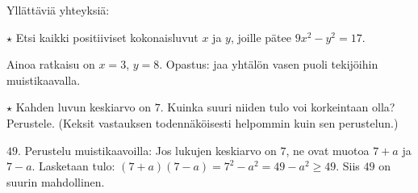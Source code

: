 \begin{tehtavasivu}
\begin{tehtava} 
	Yllättäviä yhteyksiä:

    \begin{vastaus}
    \end{vastaus}
\end{tehtava}

\begin{tehtava}
    $\star$ Etsi kaikki positiiviset kokonaisluvut $x$ ja $y$, joille pätee $9x^2-y^2=17$.
    \begin{vastaus}
    Ainoa ratkaisu on $x = 3$, $y=8$. Opastus: jaa yhtälön vasen puoli tekijöihin muistikaavalla. 
    \end{vastaus}
\end{tehtava}

\begin{tehtava}
    $\star$ Kahden luvun keskiarvo on $7$. Kuinka suuri niiden tulo voi korkeintaan olla? Perustele. (Keksit vastauksen todennäköisesti helpommin kuin sen perustelun.)
    \begin{vastaus}
        $49$. Perustelu muistikaavoilla: Jos lukujen keskiarvo on $7$, ne ovat muotoa $7+a$ ja $7-a$. Lasketaan tulo: $(7+a)(7-a)=7^2-a^2 = 49-a^2 \geq 49$. Siis $49$ on suurin mahdollinen.
    \end{vastaus}
\end{tehtava}

\end{tehtavasivu}